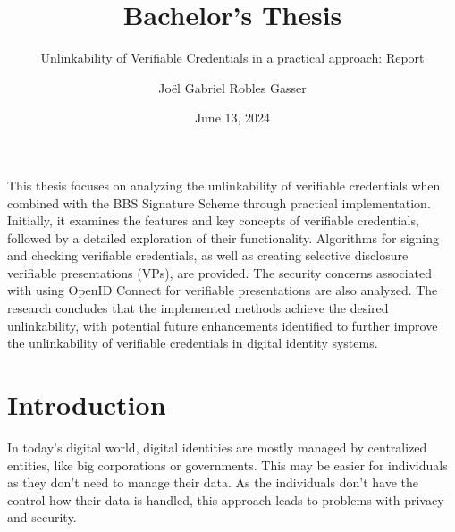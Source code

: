 \documentclass[
	a4paper               %
	,BCOR=0mm            %
	,bibliography=totoc   %
	,listof=totoc         %
	,monolingual
	,twoside=false
]{bfhthesis}              %
\begin{document}
\frontmatter

\title{Bachelor's Thesis}
\subtitle{Unlinkability of Verifiable Credentials in a practical approach: Report}
\author{Joël Gabriel Robles Gasser}
\date{June 13, 2024}

\maketitle

This thesis focuses on analyzing the unlinkability of verifiable credentials when combined with the BBS Signature Scheme through practical implementation. Initially, it examines the features and key concepts of verifiable credentials, followed by a detailed exploration of their functionality. Algorithms for signing and checking verifiable credentials, as well as creating selective disclosure verifiable presentations (VPs), are provided. The security concerns associated with using OpenID Connect for verifiable presentations are also analyzed. The research concludes that the implemented methods achieve the desired unlinkability, with potential future enhancements identified to further improve the unlinkability of verifiable credentials in digital identity systems.


\tableofcontents

\mainmatter

\chapter{Introduction}
In today's digital world, digital identities are mostly managed by centralized entities, like big corporations or governments. This may be easier for individuals as they don't need to manage their data. As the individuals don't have the control how their data is handled, this approach leads to problems with privacy and security. \\
\end{document}
